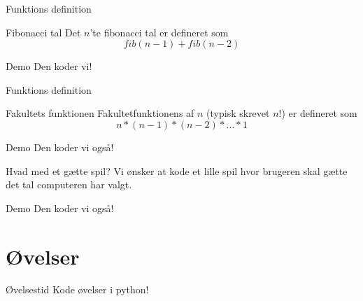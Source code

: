 \documentclass[12pt,t]{beamer}
\begin{document}
    \begin{frame}{Funktions definition}
            \begin{block}{Fibonacci tal}
                Det $n$'te fibonacci tal er defineret som
                $$
                    fib(n-1) + fib(n-2)
                $$
            \end{block}
            \pause
            \begin{block}{Demo}
                 Den koder vi!
            \end{block}
    \end{frame}


    \begin{frame}{Funktions definition}
        \begin{block}{Fakultets funktionen}
            Fakultetfunktionens af $n$ (typisk skrevet $n!$) er defineret som
            $$
                n * (n-1) * (n-2) * \dots * 1
            $$
        \end{block}

        \begin{block}{Demo}
             Den koder vi også!
        \end{block}
    \end{frame}

    \begin{frame}{Hvad med et gætte spil?}
         Vi ønsker at kode et lille spil hvor brugeren skal gætte
         det tal computeren har valgt.

        \begin{block}{Demo}
            Den koder vi også!
        \end{block}
    \end{frame}

    \section{Øvelser}
    \begin{frame}[t]{Øvelsestid}
        Kode øvelser i python!
    \end{frame}
\end{document}
